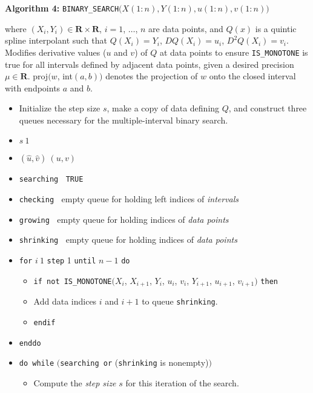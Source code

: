 \vskip 5mm {\parindent 0mm {\bf Algorithm 4:}
{\tt BINARY\_SEARCH}$\bigl(X(1{:}n), Y(1{:}n), u(1{:}n), v(1{:}n) \bigr)$

\nobreak
where $(X_i,Y_i) \in \mathbf{R}\times\mathbf{R}$, $i = 1$, $\ldots$, $n$ are
data points, and $Q(x)$ is a quintic spline interpolant such that
$Q(X_i) = Y_i$, $DQ(X_i) = u_i$, $D^2Q(X_i) = v_i$. Modifies
derivative values ($u$ and $v$) of $Q$ at data points to ensure
{\tt IS\_MONOTONE} is true for all intervals defined by adjacent data
points, given a desired precision $\mu \in {\mathbf R}$. proj$\bigl(w$,
int$(a,b)\bigr)$ denotes the projection of $w$ onto the closed
interval with endpoints $a$ and $b$.

}
{\parindent=6mm
\begin{itemize}
\item[]{ Initialize the step size $s$, make a copy of data defining $Q$,
and construct three queues necessary for the multiple-interval binary search.}
\item[]{ $s \: 1$}
\item[]{ $(\hat u,\hat v) \: (u,v)$}
\item[]{ {\tt searching} $\:$ {\tt TRUE}}
\item[]{ {\tt checking} $\:$ empty queue for holding left indices of {\it intervals}}
\item[]{ {\tt growing} $\:$ empty queue for holding indices of {\it data points}}
\item[]{ {\tt shrinking} $\:$ empty queue for holding indices of {\it data points}}
\item[]{ {\tt for} $i\:1$ {\tt step} 1 {\tt until} $n-1$ {\tt do}}
\begin{itemize}
\item[]{ {\tt if not IS\_MONOTONE}$\bigl( X_i$, $X_{i+1}$, $Y_i$, $u_i$,
$v_i$, $Y_{i+1}$, $u_{i+1}$, $v_{i+1} \bigr)$ {\tt then}}
\item[]{ \codent Add data indices $i$ and $i+1$ to queue {\tt shrinking}.}
\item[]{ {\tt endif}}
\end{itemize}
\item[]{ {\tt enddo}}
\item[]{ {\tt do while} $\bigl(${\tt searching or} ({\tt shrinking} is
nonempty)$\bigr)$}
\begin{itemize}
\item[]{ Compute the {\it step size} $s$ for this iteration of the search.}

\end{itemize}
\end{itemize}}

